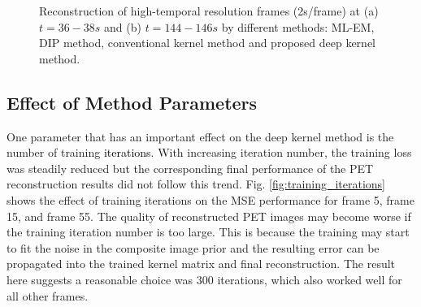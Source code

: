 \documentclass[]{IEEETran}
\newcommand{\txtb}[1]{\textcolor{black}{#1}}
\begin{document}
	
	\begin{figure}[t]
		\centering
		\hfil
		\caption{Reconstruction of high-temporal resolution frames (2s/frame) at (a) $t=36-38s$ and (b) $t=144-146s$ by different methods: ML-EM, DIP method, conventional kernel method and proposed deep kernel method.}
		\label{fig:MV}
	\end{figure} 
	
	\subsection{Effect of Method Parameters}
	
	One parameter that has an important effect on the deep kernel method is the number of training \txtb{iterations}. With increasing iteration number, the training loss was steadily reduced but the corresponding final performance of the PET reconstruction results did not follow this trend. Fig. \ref{fig:training_iterations} shows the effect of training iterations on the MSE performance for frame 5, frame 15, and frame 55. The quality of reconstructed PET images may become worse if the training iteration number is too large. This is because the training may start to fit the noise in the composite image prior and the resulting error can be propagated into the trained kernel matrix and final reconstruction. The result here suggests a reasonable choice was 300 iterations, which also worked well for all other frames.
	
\end{document}
